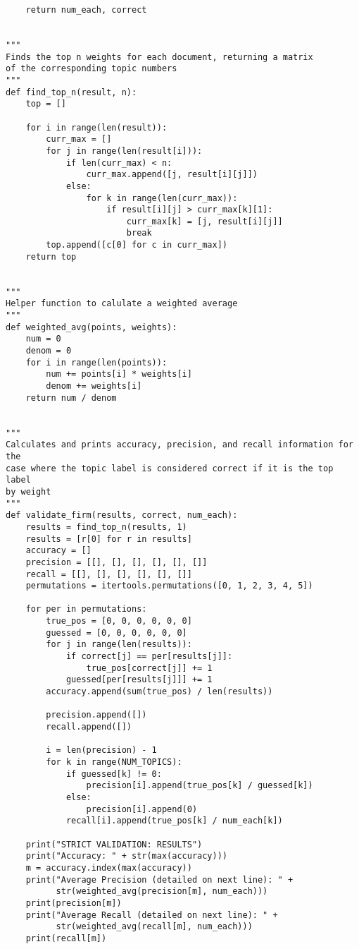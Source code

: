 \documentclass{article}
\begin{document}
\begin{verbatim}
    return num_each, correct


"""
Finds the top n weights for each document, returning a matrix
of the corresponding topic numbers
"""
def find_top_n(result, n):
    top = []

    for i in range(len(result)):
        curr_max = []
        for j in range(len(result[i])):
            if len(curr_max) < n:
                curr_max.append([j, result[i][j]])
            else:
                for k in range(len(curr_max)):
                    if result[i][j] > curr_max[k][1]:
                        curr_max[k] = [j, result[i][j]]
                        break
        top.append([c[0] for c in curr_max])
    return top


"""
Helper function to calulate a weighted average
"""
def weighted_avg(points, weights):
    num = 0
    denom = 0
    for i in range(len(points)):
        num += points[i] * weights[i]
        denom += weights[i]
    return num / denom


"""
Calculates and prints accuracy, precision, and recall information for the 
case where the topic label is considered correct if it is the top label 
by weight
"""
def validate_firm(results, correct, num_each):
    results = find_top_n(results, 1)
    results = [r[0] for r in results]
    accuracy = []
    precision = [[], [], [], [], [], []]
    recall = [[], [], [], [], [], []]
    permutations = itertools.permutations([0, 1, 2, 3, 4, 5])

    for per in permutations:
        true_pos = [0, 0, 0, 0, 0, 0]
        guessed = [0, 0, 0, 0, 0, 0]
        for j in range(len(results)):
            if correct[j] == per[results[j]]:
                true_pos[correct[j]] += 1
            guessed[per[results[j]]] += 1
        accuracy.append(sum(true_pos) / len(results))

        precision.append([])
        recall.append([])

        i = len(precision) - 1
        for k in range(NUM_TOPICS):
            if guessed[k] != 0:
                precision[i].append(true_pos[k] / guessed[k])
            else:
                precision[i].append(0)
            recall[i].append(true_pos[k] / num_each[k])

    print("STRICT VALIDATION: RESULTS")
    print("Accuracy: " + str(max(accuracy)))
    m = accuracy.index(max(accuracy))
    print("Average Precision (detailed on next line): " +
          str(weighted_avg(precision[m], num_each)))
    print(precision[m])
    print("Average Recall (detailed on next line): " +
          str(weighted_avg(recall[m], num_each)))
    print(recall[m])



\end{verbatim}
\end{document}
